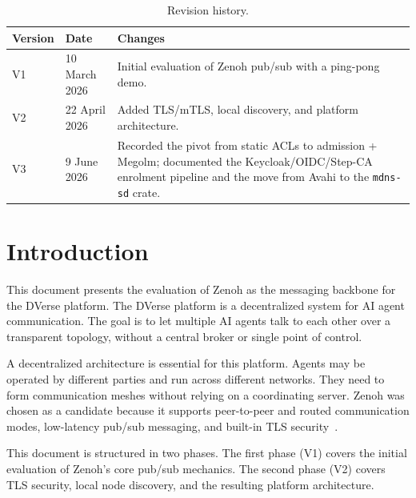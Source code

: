 \documentclass[11pt,a4paper]{article}
\begin{document}
\begin{table}[H]
  \centering
  \small
  \begin{tabular}{|l|l|p{7.5cm}|}
    \hline
    \rowcolor{gray!15}
    \textbf{Version} & \textbf{Date} & \textbf{Changes} \\
    \hline
    V1 & 10 March 2026 & Initial evaluation of Zenoh pub/sub
    with a ping-pong demo. \\
    \hline
    V2 & 22 April 2026 & Added TLS/mTLS, local discovery, and
    platform architecture. \\
    \hline
    V3 & 9 June 2026 & Recorded the pivot from static ACLs to
    admission + Megolm; documented the Keycloak/OIDC/Step-CA
    enrolment pipeline and the move from Avahi to the
    \texttt{mdns-sd} crate. \\
    \hline
  \end{tabular}
  \caption{Revision history.}
  \label{tab:history}
\end{table}

\newpage
\tableofcontents
\newpage
\listoffigures
\vspace{1em}
\listoftables
\vspace{1em}
\renewcommand{\lstlistlistingname}{List of Listings}
\lstlistoflistings
\newpage

\section{Introduction}

This document presents the evaluation of Zenoh as the messaging
backbone for the DVerse platform. The DVerse platform is a
decentralized system for AI agent communication. The goal is to let
multiple AI agents talk to each other over a transparent topology,
without a central broker or single point of control.

A decentralized architecture is essential for this platform. Agents
may be operated by different parties and run across different
networks. They need to form communication meshes without relying on a
coordinating server. Zenoh was chosen as a candidate because it
supports peer-to-peer and routed communication modes, low-latency
pub/sub messaging, and built-in TLS security~\citep{zenoh-tls,zenoh-deployment}.

This document is structured in two phases. The first phase (V1)
covers the initial evaluation of Zenoh's core pub/sub mechanics. The
second phase (V2) covers TLS security, local node discovery, and the
resulting platform architecture.
\end{document}
